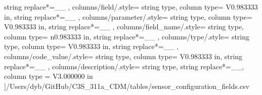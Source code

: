 \begin{landscape}
{            string replace*={_}{\_}
        },
    columns/field/.style={
            string type, 
            column type= V{0.983333 in}, 
            string replace*={_}{\_}
        },
    columns/parameter/.style={
            string type, 
            column type= V{0.983333 in}, 
            string replace*={_}{\_}
        },
    columns/field_name/.style={
            string type, 
            column type= n{0.983333 in}, 
            string replace*={_}{\_}
        },
    columns/type/.style={
            string type, 
            column type= V{0.983333 in}, 
            string replace*={_}{\_}
        },
    columns/code_value/.style={
            string type, 
            column type= V{0.983333 in}, 
            string replace*={_}{\_}
        },
    columns/description/.style={
            string type, 
            string replace*={_}{\_},
            column type = V{3.000000 in}
        }
    ]{/Users/dyb/GitHub/C3S_311a_CDM/tables/sensor_configuration_fields.csv}
\end{landscape}
